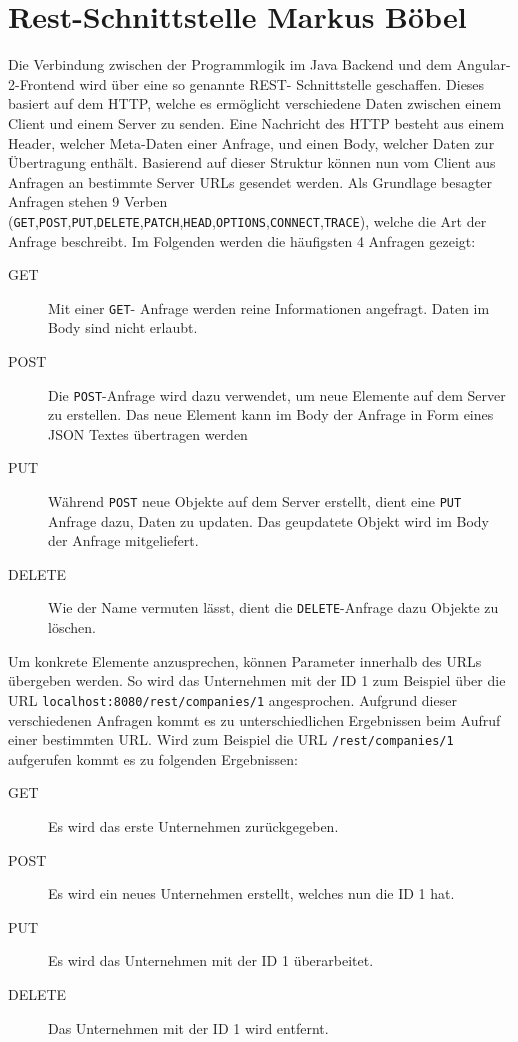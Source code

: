 \section{Rest-Schnittstelle \textnormal{\textsf{\small{Markus Böbel}}}}
\label{sec:rest}

Die Verbindung zwischen der Programmlogik im Java Backend und dem Angular-2-Frontend wird über eine so genannte \acf{REST}- Schnittstelle geschaffen. Dieses basiert auf dem \acf{HTTP}, welche es ermöglicht verschiedene Daten zwischen einem Client und einem Server zu senden.
Eine Nachricht des \acl{HTTP} besteht aus einem Header, welcher Meta-Daten einer Anfrage, und einen Body, welcher Daten zur Übertragung enthält.
Basierend auf dieser Struktur können nun vom Client aus Anfragen an bestimmte Server URLs gesendet werden. Als Grundlage besagter Anfragen stehen 9 Verben (\texttt{GET},\texttt{POST},\texttt{PUT},\texttt{DELETE},\texttt{PATCH},\texttt{HEAD},\texttt{OPTIONS},\texttt{CONNECT},\texttt{TRACE}), welche die Art der Anfrage beschreibt. Im Folgenden werden die häufigsten 4 Anfragen gezeigt:

\begin{description} 
	\item  [GET] {Mit einer \texttt{GET}- Anfrage werden reine Informationen angefragt. Daten im Body sind nicht erlaubt.}
	\item [POST]{Die \texttt{POST}-Anfrage wird dazu verwendet, um neue Elemente auf dem Server zu erstellen. Das neue Element kann im Body der Anfrage in Form eines JSON Textes übertragen werden}
	\item [PUT]{Während \texttt{POST} neue Objekte auf dem Server erstellt, dient eine \texttt{PUT} Anfrage dazu, Daten zu updaten. Das geupdatete Objekt wird im Body der Anfrage mitgeliefert}.
	\item[DELETE] {Wie der Name vermuten lässt, dient die \texttt{DELETE}-Anfrage dazu Objekte zu löschen}.
	
\end{description}

Um konkrete Elemente anzusprechen, können Parameter innerhalb des URLs übergeben werden. So wird das Unternehmen mit der ID 1 zum Beispiel über die URL 
\texttt{localhost:8080/rest/companies/1} angesprochen.
Aufgrund dieser verschiedenen Anfragen kommt es zu unterschiedlichen Ergebnissen beim Aufruf einer bestimmten URL. Wird zum Beispiel die URL \texttt{/rest/companies/1} aufgerufen kommt es zu folgenden Ergebnissen:

\begin{description} 
	\item[GET] Es wird das erste Unternehmen zurückgegeben.
	\item[POST] Es wird ein neues Unternehmen erstellt, welches nun die ID 1 hat.
	\item[PUT] Es wird das Unternehmen mit der ID 1 überarbeitet.
	\item[DELETE] Das Unternehmen mit der ID 1 wird entfernt.
\end{description}

